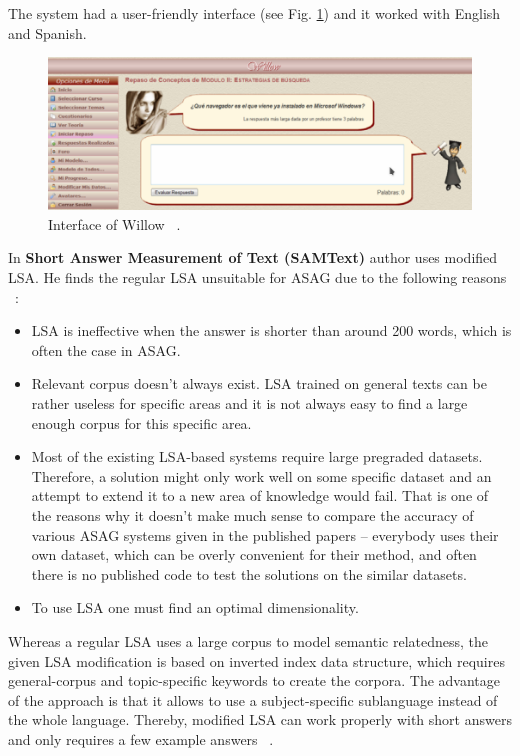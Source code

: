 The system had a user-friendly interface (see Fig. \ref{fig:Willow}) and it worked with English and Spanish.\\

\begin{figure}[h!]
  \centering
  \includegraphics[width=\textwidth]{img/Willow}
    \caption{ Interface of Willow ~\cite{Willow}. }\label{fig:Willow}
\end{figure}


In \textbf{Short Answer Measurement of Text (SAMText)} author uses modified LSA. He finds the regular LSA unsuitable for ASAG due to the following reasons ~\cite{SAMText}:
\begin{itemize}
\item LSA is ineffective when the answer is shorter than around 200 words, which is often the case in ASAG.
\item Relevant corpus doesn't always exist. LSA trained on general texts can be rather useless for specific areas and it is not always easy to find a large enough corpus for this specific area.
\item Most of the existing LSA-based systems require large pregraded datasets. Therefore, a solution might only work well on some specific dataset and an attempt to extend it to a new area of knowledge would fail. That is one of the reasons why it doesn't make much sense to compare the accuracy of various ASAG systems given in the published papers -- everybody uses their own dataset, which can be overly convenient for their method, and often there is no published code to test the solutions on the similar datasets. 
\item To use LSA one must find an optimal dimensionality.
\end{itemize}
Whereas a regular LSA uses a large corpus to model semantic relatedness, the given LSA modification is based on inverted index data structure, which requires general-corpus and topic-specific keywords to create the corpora. The advantage of the approach is that it allows to use a subject-specific sublanguage  instead of the whole language. Thereby, modified LSA can work properly with short answers and only requires a few example answers ~\cite{Burrows}.\\

